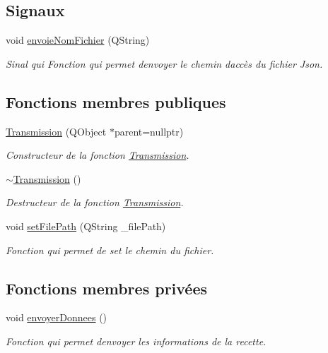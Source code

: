 \subsection*{Signaux}
\begin{DoxyCompactItemize}
\item 
void \hyperlink{classTransmission_abf18bf1963c75b06b1e437bec51de35e}{envoie\+Nom\+Fichier} (Q\+String)
\begin{DoxyCompactList}\small\item\em Sinal qui Fonction qui permet d\textquotesingle{}envoyer le chemin d\textquotesingle{}accès du fichier Json. \end{DoxyCompactList}\end{DoxyCompactItemize}
\subsection*{Fonctions membres publiques}
\begin{DoxyCompactItemize}
\item 
\hyperlink{classTransmission_a1d8087d2d09b9ddd4fd6e8261daed9f3}{Transmission} (Q\+Object $\ast$parent=nullptr)
\begin{DoxyCompactList}\small\item\em Constructeur de la fonction \hyperlink{classTransmission}{Transmission}. \end{DoxyCompactList}\item 
\hyperlink{classTransmission_adcdc6012d99ddb1d0c3159d50984e146}{$\sim$\+Transmission} ()
\begin{DoxyCompactList}\small\item\em Destructeur de la fonction \hyperlink{classTransmission}{Transmission}. \end{DoxyCompactList}\item 
void \hyperlink{classTransmission_a5099a8d2ae60a2f159230bf81bafebdc}{set\+File\+Path} (Q\+String \+\_\+file\+Path)
\begin{DoxyCompactList}\small\item\em Fonction qui permet de set le chemin du fichier. \end{DoxyCompactList}\end{DoxyCompactItemize}
\subsection*{Fonctions membres privées}
\begin{DoxyCompactItemize}
\item 
void \hyperlink{classTransmission_a14b885539e973a158c9c4c25fd99bc04}{envoyer\+Donnees} ()
\begin{DoxyCompactList}\small\item\em Fonction qui permet d\textquotesingle{}envoyer les informations de la recette. \end{DoxyCompactList}\end{DoxyCompactItemize}
